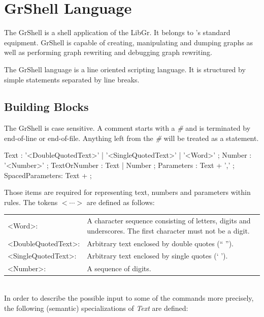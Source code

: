 \chapter{GrShell Language}

The GrShell is a shell application of the LibGr. It belongs to \GrG's standard equipment. GrShell is capable of creating, manipulating and dumping graphs as well as performing graph rewriting and debugging graph rewriting.

The GrShell language is a line oriented scripting language. It is structured by simple statements separated by line breaks.

\section{Building Blocks}

The GrShell is case sensitive. A comment starts with a \emph{\#} and is terminated by end-of-line or end-of-file. Anything left from the \emph{\#} will be treated as a statement.

\begin{rail} 
 Text : '<DoubleQuotedText>' | '<SingleQuotedText>' | '<Word>' ;
 Number : '<Number>' ;
 TextOrNumber : Text | Number ;
 Parameters : Text + ',' ;
 SpacedParameters: Text + ; 
\end{rail}

Those items are required for representing text, numbers and parameters within rules. The tokens $<\cdots>$ are defined as follows:\\

\begin{tabularx}{\linewidth}{lX}
<Word>: & A character sequence consisting of letters, digits and underscores. The first character must not be a digit.\\
<DoubleQuotedText>: & Arbitrary text enclosed by double quotes (`` '').\\
<SingleQuotedText>: & Arbitrary text enclosed by single quotes (` ').\\
<Number>: & A sequence of digits.
\end{tabularx}\\

In order to describe the possible input to some of the commands more precisely, the following (semantic) specializations of \emph{Text} are defined:\\

